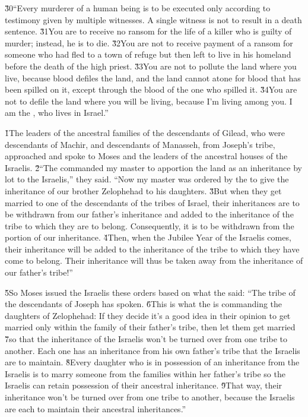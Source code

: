\v{30}``Every murderer of a human being is to be executed only according to testimony given by multiple witnesses. A single witness is not to result in a death sentence. \v{31}You are to receive no ransom for the life of a killer who is guilty of murder; instead, he is to die. \v{32}You are not to receive payment of a ransom for someone who had fled to a town of refuge but then left to live in his homeland before the death of the high priest. \v{33}You are not to pollute the land where you live, because blood defiles the land, and the land cannot atone for blood that has been spilled on it, except through the blood of the one who spilled it. \v{34}You are not to defile the land where you will be living, because I'm living among you. I am the , who lives in Israel.''

\v{1}The leaders of the ancestral families of the descendants of Gilead, who were descendants of Machir, and descendants of Manasseh, from Joseph's tribe, approached and spoke to Moses and the leaders of the ancestral houses of the Israelis. \v{2}``The  commanded my master to apportion the land as an inheritance by lot to the Israelis,'' they said. ``Now my master was ordered by the  to give the inheritance of our brother Zelophehad to his daughters. \v{3}But when they get married to one of the descendants of the tribes of Israel, their inheritances are to be withdrawn from our father's inheritance and added to the inheritance of the tribe to which they are to belong. Consequently, it is to be withdrawn from the portion of our inheritance. \v{4}Then, when the Jubilee Year of the Israelis comes, their inheritance will be added to the inheritance of the tribe to which they have come to belong. Their inheritance will thus be taken away from the inheritance of our father's tribe!''

\v{5}So Moses issued the Israelis these orders based on what the  said: ``The tribe of the descendants of Joseph has spoken. \v{6}This is what the  is commanding the daughters of Zelophehad: If they decide it's a good idea in their opinion to get married only within the family of their father's tribe, then let them get married \v{7}so that the inheritance of the Israelis won't be turned over from one tribe to another. Each one has an inheritance from his own father's tribe that the Israelis are to maintain. \v{8}Every daughter who is in possession of an inheritance from the Israelis is to marry someone from the families within her father's tribe so the Israelis can retain possession of their ancestral inheritance. \v{9}That way, their inheritance won't be turned over from one tribe to another, because the Israelis are each to maintain their ancestral inheritances.''

